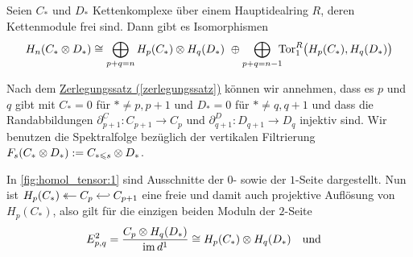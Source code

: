 \begin{satz}[label=satz:homol_tensor,{name=[{Homologie des Tensorproduktes von Kettenkomplexen}]{Künneth}}]
	Seien $C_*$ und $D_*$ Kettenkomplexe über einem Hauptidealring $R$, deren Kettenmodule frei sind.
	Dann gibt es Isomorphismen
	\[
		H_n \enbrace*{C_* \otimes D_*} \cong \smashoperator[r]{\bigoplus_{p+q=n}}\enspace H_p(C_*) \otimes H_q(D_*) \,\,\oplus \smashoperator[r]{\bigoplus_{p+q=n-1}}\enspace \Tor_1^R \enbrace[\big]{H_p(C_*),H_q(D_*)}
	\]
\end{satz}
\begin{beweis}
	Nach dem \hyperref[zerlegungssatz]{Zerlegungssatz (\ref*{zerlegungssatz})} können wir annehmen, dass es $p$ und $q$ gibt mit $C_*=0$ für $*\neq p,p+1$ und $D_*=0$ für $* \neq q,q+1$ und dass die Randabbildungen $\partial^C_{p+1} \colon C_{p+1} \to C_p$ und $\partial^D_{q+1} \colon D_{q+1} \to D_q$ injektiv sind.
	Wir benutzen die Spektralfolge bezüglich der vertikalen Filtrierung $F_s \enbrace*{C_* \otimes D_*} := C_{*\le s} \otimes D_*$.
	\begin{figure}[hbt]
	\end{figure}
	In \cref{fig:homol_tensor:1} sind Ausschnitte der $0$- sowie der $1$-Seite dargestellt.
	Nun ist $\begin{tikzcd}[cramped,sep=small] H_p(C_*) & C_p \lar[two heads] & C_{p+1} \lar[{Hooks[left]}-{Computer Modern Rightarrow}] \end{tikzcd}$ eine freie und damit auch projektive Auflösung von $H_p(C_*)$, also gilt für die einzigen beiden Moduln der $2$-Seite
	\begin{align}
		E^2_{p,q} &= \frac{C_p \otimes H_q(D_*)}{\im d^1} \cong H_p \enbrace*{C_*} \otimes H_q(D_*) \quad \text{und} \quad \\

\end{align}
\end{beweis}
